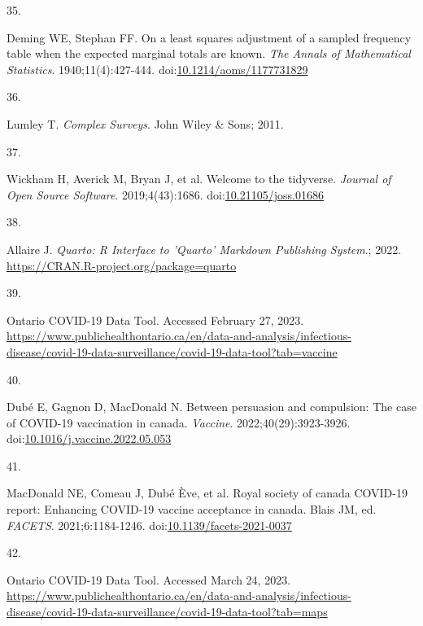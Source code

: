\documentclass[
  letterpaper,
  DIV=11,
  numbers=noendperiod]{scrartcl}
\newlength{\cslhangindent}
\newlength{\csllabelwidth}
\newlength{\cslentryspacingunit} %
\newenvironment{CSLReferences}[2] %
 {%
  \setlength{\parindent}{0pt}
  \ifodd #1
  \let\oldpar\par
  \def\par{\hangindent=\cslhangindent\oldpar}
  \fi
  \setlength{\parskip}{#2\cslentryspacingunit}
 }%
 {}
\newcommand{\CSLLeftMargin}[1]{\parbox[t]{\csllabelwidth}{#1}}
\newcommand{\CSLRightInline}[1]{\parbox[t]{\linewidth - \csllabelwidth}{#1}\break}
\begin{document}
\begin{CSLReferences}{0}{0}
\leavevmode{}%
\CSLLeftMargin{35. }%
\CSLRightInline{Deming WE, Stephan FF. On a least squares adjustment of
a sampled frequency table when the expected marginal totals are known.
\emph{The Annals of Mathematical Statistics}. 1940;11(4):427-444.
doi:\href{https://doi.org/10.1214/aoms/1177731829}{10.1214/aoms/1177731829}}

\leavevmode{}%
\CSLLeftMargin{36. }%
\CSLRightInline{Lumley T. \emph{Complex Surveys}. John Wiley \& Sons;
2011.}

\leavevmode{}%
\CSLLeftMargin{37. }%
\CSLRightInline{Wickham H, Averick M, Bryan J, et al. Welcome to the
{tidyverse}. \emph{Journal of Open Source Software}. 2019;4(43):1686.
doi:\href{https://doi.org/10.21105/joss.01686}{10.21105/joss.01686}}

\leavevmode{}%
\CSLLeftMargin{38. }%
\CSLRightInline{Allaire J. \emph{Quarto: R Interface to 'Quarto'
Markdown Publishing System}.; 2022.
\url{https://CRAN.R-project.org/package=quarto}}

\leavevmode{}%
\CSLLeftMargin{39. }%
\CSLRightInline{{Ontario COVID-19 Data Tool}. Accessed February 27,
2023.
\url{https://www.publichealthontario.ca/en/data-and-analysis/infectious-disease/covid-19-data-surveillance/covid-19-data-tool?tab=vaccine}}

\leavevmode{}%
\CSLLeftMargin{40. }%
\CSLRightInline{Dubé E, Gagnon D, MacDonald N. Between persuasion and
compulsion: The case of {COVID}-19 vaccination in canada.
\emph{Vaccine}. 2022;40(29):3923-3926.
doi:\href{https://doi.org/10.1016/j.vaccine.2022.05.053}{10.1016/j.vaccine.2022.05.053}}

\leavevmode{}%
\CSLLeftMargin{41. }%
\CSLRightInline{MacDonald NE, Comeau J, Dubé Ève, et al. Royal society
of canada {COVID}-19 report: Enhancing {COVID}-19 vaccine acceptance in
canada. Blais JM, ed. \emph{{FACETS}}. 2021;6:1184-1246.
doi:\href{https://doi.org/10.1139/facets-2021-0037}{10.1139/facets-2021-0037}}

\leavevmode{}%
\CSLLeftMargin{42. }%
\CSLRightInline{{Ontario COVID-19 Data Tool}. Accessed March 24, 2023.
\url{https://www.publichealthontario.ca/en/data-and-analysis/infectious-disease/covid-19-data-surveillance/covid-19-data-tool?tab=maps}}


\end{CSLReferences}
\end{document}
